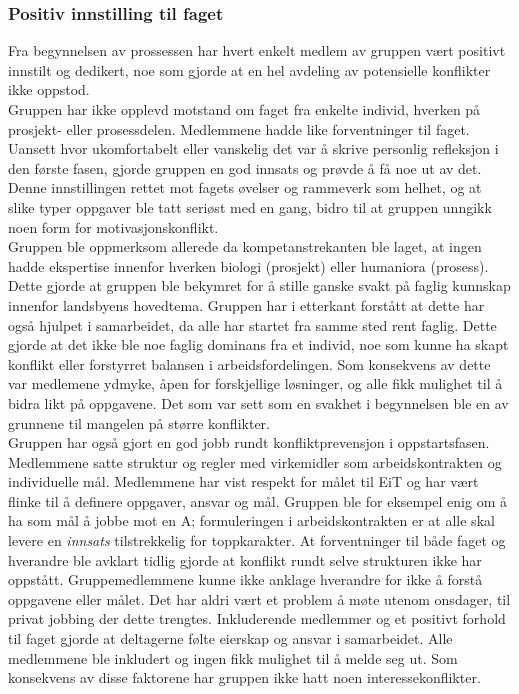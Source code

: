 \subsubsection{Positiv innstilling til faget}

Fra begynnelsen av prossessen har hvert enkelt medlem av gruppen vært positivt innstilt og dedikert, noe som gjorde at en hel avdeling av potensielle konflikter ikke oppstod.\\

Gruppen har ikke opplevd motstand om faget fra enkelte individ, hverken på prosjekt- eller prosessdelen. 
Medlemmene hadde like forventninger til faget. Uansett hvor ukomfortabelt eller vanskelig det var å skrive personlig refleksjon i den første fasen, gjorde gruppen en god innsats og prøvde å få noe ut av det.
Denne innstillingen rettet mot fagets øvelser og rammeverk som helhet, og at slike typer oppgaver ble tatt seriøst med en gang, bidro til at gruppen unngikk noen form for motivasjonskonflikt.\\

Gruppen ble oppmerksom allerede da kompetanstrekanten ble laget, at ingen hadde ekspertise innenfor hverken biologi (prosjekt) eller humaniora (prosess).
Dette gjorde at gruppen ble bekymret for å stille ganske svakt på faglig kunnskap innenfor landsbyens hovedtema.
Gruppen har i etterkant forstått at dette har også hjulpet i samarbeidet, da alle har startet fra samme sted rent faglig.
Dette gjorde at det ikke ble noe faglig dominans fra et individ, noe som kunne ha skapt konflikt eller forstyrret balansen i arbeidsfordelingen.
Som konsekvens av dette var medlemene ydmyke, åpen for forskjellige løsninger, og alle fikk mulighet til å bidra likt på oppgavene.
Det som var sett som en svakhet i begynnelsen ble en av grunnene til mangelen på større konflikter.\\

Gruppen har også gjort en god jobb rundt konfliktprevensjon i oppstartsfasen. 
Medlemmene satte struktur og regler med virkemidler som arbeidskontrakten og individuelle mål. 
Medlemmene har vist respekt for målet til EiT og har vært flinke til å definere oppgaver, ansvar og mål.
Gruppen ble for eksempel enig om å ha som mål å jobbe mot en A; formuleringen i arbeidskontrakten er at alle skal levere en \emph{innsats} tilstrekkelig for toppkarakter.
At forventninger til både faget og hverandre ble avklart tidlig gjorde at konflikt rundt selve strukturen ikke har oppstått. Gruppemedlemmene kunne ikke anklage hverandre for ikke å forstå oppgavene eller målet.
Det har aldri vært et problem å møte utenom onsdager, til privat jobbing der dette trengtes.
Inkluderende medlemmer og et positivt forhold til faget gjorde at deltagerne følte eierskap og ansvar i samarbeidet.
Alle medlemmene ble inkludert og ingen fikk mulighet til å melde seg ut.
Som konsekvens av disse faktorene har gruppen ikke hatt noen interessekonflikter.
